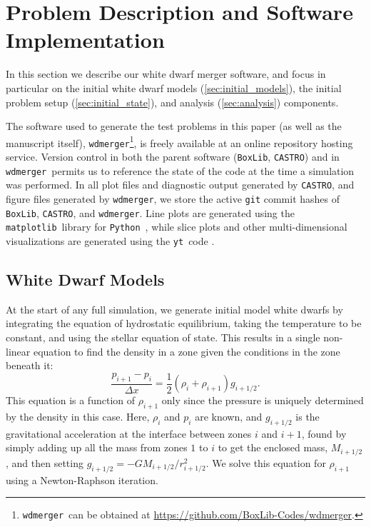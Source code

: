 \documentclass[iop,numberedappendix]{../emulateapj}
\newcommand{\boxlib}{\texttt{BoxLib}}
\newcommand{\castro}{\texttt{CASTRO}}
\newcommand{\wdmerger}{\texttt{wdmerger}}
\newcommand{\python}{\texttt{Python}}
\newcommand{\matplotlib}{\texttt{matplotlib}}
\newcommand{\yt}{\texttt{yt}}
\begin{document}
\section{Problem Description and Software Implementation}
\label{sec:implementation}

In this section we describe our white dwarf merger software, and focus in 
particular on the initial white dwarf models (\autoref{sec:initial_models}), 
the initial problem setup (\autoref{sec:initial_state}), and analysis 
(\autoref{sec:analysis}) components.

The software used to generate the test problems in this paper
(as well as the manuscript itself),
\wdmerger\footnote{\wdmerger\ can be obtained at \url{https://github.com/BoxLib-Codes/wdmerger}.},
is freely available at an online repository hosting service.
Version control in both the parent software (\boxlib, \castro) and in \wdmerger\
permits us to reference the state of the code at the time a simulation
was performed. In all plot files and diagnostic output generated by \castro, 
and figure files generated by \wdmerger,
we store the active \texttt{git} commit hashes of \boxlib, \castro, and \wdmerger.
Line plots are generated using the \matplotlib\ library for \python\ 
\citep{matplotlib}, while slice plots and other multi-dimensional visualizations are 
generated using the \yt\ code \citep{yt}.

\subsection{White Dwarf Models}
\label{sec:initial_models}

At the start of any full simulation, we generate initial model white
dwarfs by integrating the equation of hydrostatic equilibrium, taking
the temperature to be constant, and using the
stellar equation of state.  This results in a single non-linear
equation to find the density in a zone given the conditions in the
zone beneath it:
\begin{equation}
\frac{p_{i+1} - p_i}{\Delta x} = \frac{1}{2} (\rho_i + \rho_{i+1}) g_{i+1/2}.
\end{equation}
This equation is a function of $\rho_{i+1}$ only since the pressure is
uniquely determined by the density in this case. Here, $\rho_i$ and $p_i$
are known, and $g_{i+1/2}$ is the gravitational acceleration at the
interface between zones $i$ and $i+1$, found by simply adding up all
the mass from zones $1$ to $i$ to get the enclosed mass,
$M_{i+1/2}$, and then setting $g_{i+1/2} =
-GM_{i+1/2}/r_{i+1/2}^2$. We solve this equation for $\rho_{i+1}$
using a Newton-Raphson iteration.
\end{document}
